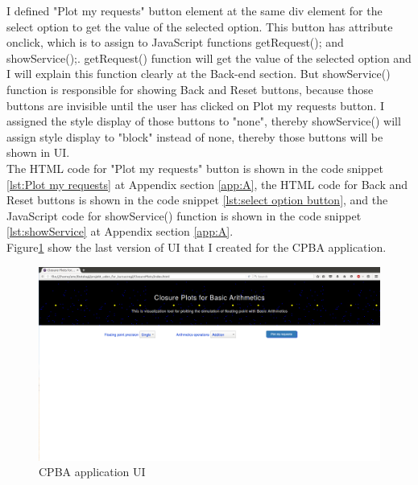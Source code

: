 \documentclass[11pt]{article}
\begin{document}
I defined "Plot my requests" button element at the same div element for the select option to get the value of the selected option. This button has attribute onclick, which is to assign to JavaScript functions getRequest(); and showService();. getRequest() function will get the value of the selected option and I will explain this function clearly at the Back-end section. But showService() function is responsible for showing Back and Reset buttons, because those buttons are invisible until the user has clicked on Plot my requests button. I assigned the style display of those buttons to "none", thereby showService() will assign style display to "block" instead of none, thereby those buttons will be shown in UI.\\
The HTML code for "Plot my requests" button is shown in the code snippet \ref{lst:Plot my requests} at Appendix section \ref{app:A}, the HTML code for Back and Reset buttons is shown in the code snippet \ref{lst:select option button}, and the JavaScript code for showService() function is shown in the code snippet \ref{lst:showService} at Appendix section \ref{app:A}.\\

Figure\ref{UI} show the last version of UI that I created for the CPBA application.
\begin{figure}[h]
    \centering
    \includegraphics[width=1\textwidth]{layout}
    \caption{CPBA application UI}
    \label{UI}
\end{figure}\\
\end{document}
